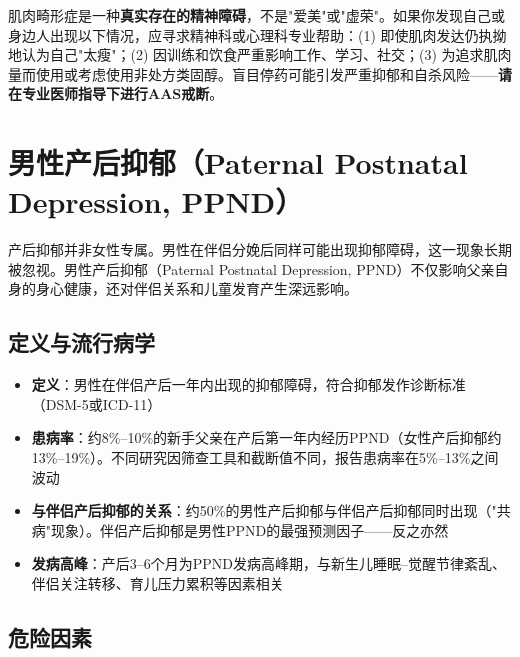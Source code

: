 \begin{enumerate}
\begin{tcolorbox}[colback=pink!5!white,colframe=red!50!black,title=贴心小叮咛]
肌肉畸形症是一种\textbf{真实存在的精神障碍}，不是"爱美"或"虚荣"。如果你发现自己或身边人出现以下情况，应寻求精神科或心理科专业帮助：(1) 即使肌肉发达仍执拗地认为自己"太瘦"；(2) 因训练和饮食严重影响工作、学习、社交；(3) 为追求肌肉量而使用或考虑使用非处方类固醇。盲目停药可能引发严重抑郁和自杀风险——\textbf{请在专业医师指导下进行AAS戒断}。
\end{tcolorbox}

\section{男性产后抑郁（Paternal Postnatal Depression, PPND）}

产后抑郁并非女性专属。男性在伴侣分娩后同样可能出现抑郁障碍，这一现象长期被忽视。男性产后抑郁（Paternal Postnatal Depression, PPND）不仅影响父亲自身的身心健康，还对伴侣关系和儿童发育产生深远影响。

\subsection{定义与流行病学}

\begin{itemize}[leftmargin=2cm]
	\item \textbf{定义}：男性在伴侣产后一年内出现的抑郁障碍，符合抑郁发作诊断标准（DSM-5或ICD-11）
	\item \textbf{患病率}：约8\%--10\%的新手父亲在产后第一年内经历PPND（女性产后抑郁约13\%--19\%）。不同研究因筛查工具和截断值不同，报告患病率在5\%--13\%之间波动
	\item \textbf{与伴侣产后抑郁的关系}：约50\%的男性产后抑郁与伴侣产后抑郁同时出现（"共病"现象）。伴侣产后抑郁是男性PPND的最强预测因子——反之亦然
	\item \textbf{发病高峰}：产后3--6个月为PPND发病高峰期，与新生儿睡眠--觉醒节律紊乱、伴侣关注转移、育儿压力累积等因素相关
\end{itemize}

\subsection{危险因素}


\end{enumerate}
